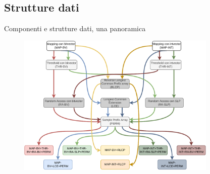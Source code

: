 \documentclass[]{beamer}
\def\RLCP{\mbox{\rm {\sf RLCP}}}
\def\MS{\mbox{\rm {\sf MS}}}
\def\SMEM{\mbox{\rm {\sf SMEM}}}
\begin{document}
\subsection{Strutture dati}
\begin{frame}{Componenti e strutture dati, una panoramica}
  \begin{figure}[H]
    \centering
    \includegraphics[width=0.85\textwidth]{img/ds.pdf}
  \end{figure}
\end{frame}
\end{document}
